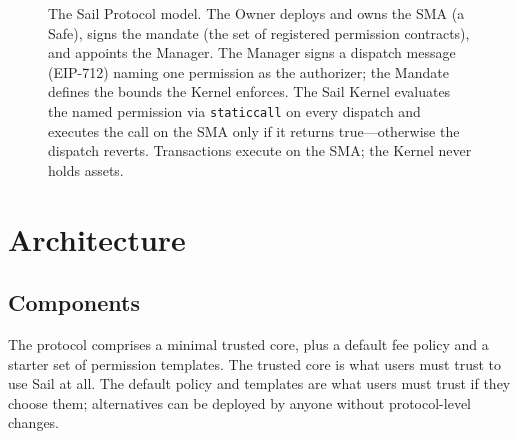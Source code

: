 \documentclass[11pt]{article}
\begin{document}
\begin{figure}[ht]
\begin{tikzpicture}
\end{tikzpicture}
\caption{The Sail Protocol model. The Owner deploys and owns the SMA (a Safe), signs the mandate (the set of registered permission contracts), and appoints the Manager. The Manager signs a dispatch message (EIP-712) naming one permission as the authorizer; the Mandate defines the bounds the Kernel enforces. The Sail Kernel evaluates the named permission via \texttt{staticcall} on every dispatch and executes the call on the SMA only if it returns true---otherwise the dispatch reverts. Transactions execute on the SMA; the Kernel never holds assets.}
\label{fig:model}
\end{figure}

\section{Architecture}

\subsection{Components}

The protocol comprises a minimal trusted core, plus a default fee policy and a starter set of permission templates. The trusted core is what users must trust to use Sail at all. The default policy and templates are what users must trust if they choose them; alternatives can be deployed by anyone without protocol-level changes.
\end{document}
